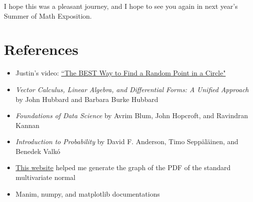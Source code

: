 \documentclass{article}
\begin{document}
I hope this was a pleasant journey, and I hope to see you again in next year's Summer of Math Exposition.

\section{References}

\begin{itemize}
    \item Justin's video: \href{https://www.youtube.com/watch?v=4y_nmpv-9lI&list=PLnQX-jgAF5pTkwtUuVpqS5tuWmJ-6ZM-Z&index=6&t=3s}{``The BEST Way to Find a Random Point in a Circle"}
    \item \textit{Vector Calculus, Linear Algebra, and Differential Forms: A Unified Approach} by John Hubbard and Barbara Burke Hubbard
    \item \textit{Foundations of Data Science} by Avrim Blum, John Hopcroft, and Ravindran Kannan
    \item \textit{Introduction to Probability} by David F. Anderson, Timo Sepp\"{a}l\"{a}inen, and Benedek Valk\'{o}
    \item \href{https://scipython.com/blog/visualizing-the-bivariate-gaussian-distribution/}{This website} helped me generate the graph of the PDF of the standard multivariate normal
    \item Manim, numpy, and matplotlib documentations
\end{itemize}
\end{document}
